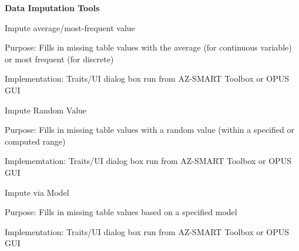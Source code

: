\bigskip

\textbf{Data Imputation Tools}

\bigskip

Impute average/most-frequent value

Purpose: Fills in missing table values with the average (for continuous variable) or most frequent
(for discrete)

Implementation: Traits/UI dialog box run from AZ-SMART Toolbox or OPUS GUI

\bigskip

Impute Random Value

Purpose: Fills in missing table values with a random value (within a specified or computed range)

Implememtation: Traits/UI dialog box run from AZ-SMART Toolbox or OPUS GUI

\bigskip

Impute via Model

Purpose: Fills in missing table values based on a specified model

Implementation: Traits/UI dialog box run from AZ-SMART Toolbox or OPUS GUI

\bigskip
